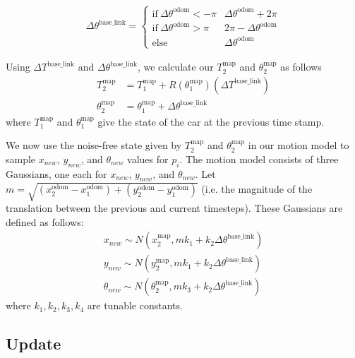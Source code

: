 \begin{align*}
    \Delta \theta^\mathrm{base\_link} = \begin{cases}
        \mathrm{if} ~ \Delta \theta^\mathrm{odom} < -\pi & \Delta \theta^\mathrm{odom} + 2\pi \\
        \mathrm{if} ~ \Delta \theta^\mathrm{odom} > \pi & 2\pi - \Delta \theta^\mathrm{odom} \\ 
        \mathrm{else} & \Delta \theta^\mathrm{odom}
    \end{cases}
\end{align*}


Using $\Delta T^\mathrm{base\_link}$ and $\Delta \theta^\mathrm{base\_link}$, we calculate our $T_2^\mathrm{map}$ and $\theta_2^\mathrm{map}$ as follows
\begin{align*}
    T_2^\mathrm{map} &= T_1^\mathrm{map} + R(\theta_1^\mathrm{map})(\Delta T^\mathrm{base\_link}) \\
    \theta_2^\mathrm{map} &= \theta_1^\mathrm{map} + \Delta \theta^\mathrm{base\_link}
\end{align*}
where $T_1^\mathrm{map}$ and $\theta_1^\mathrm{map}$ give the state of the car at the previous time stamp.

We now use the noise-free state given by $T_2^\mathrm{map}$ and $\theta_2^\mathrm{map}$ in our motion model to sample $x_{new}$, $y_{new}$, and $\theta_{new}$ values for $p_i$. The motion model consists of three Gaussians, one each for $x_{new}$, $y_{new}$, and $\theta_{new}$. Let $m = \sqrt{(x_2^\mathrm{odom} - x_1^\mathrm{odom}) + (y_2^\mathrm{odom} - y_1^\mathrm{odom})}$ (i.e. the magnitude of the translation between the previous and current timesteps). These Gaussians are defined as follows:
\begin{align*}
    x_{new} \sim N(x_2^\mathrm{map}, mk_1 + k_2\Delta \theta^\mathrm{base\_link}) \\
    y_{new} \sim N(y_2^\mathrm{map}, mk_1 + k_2\Delta \theta^\mathrm{base\_link}) \\
    \theta_{new} \sim N(\theta_2^\mathrm{map}, mk_3 + k_2\Delta \theta^\mathrm{base\_link})
\end{align*}
where $k_1, k_2, k_3, k_4$ are tunable constants.

\subsection{Update}

